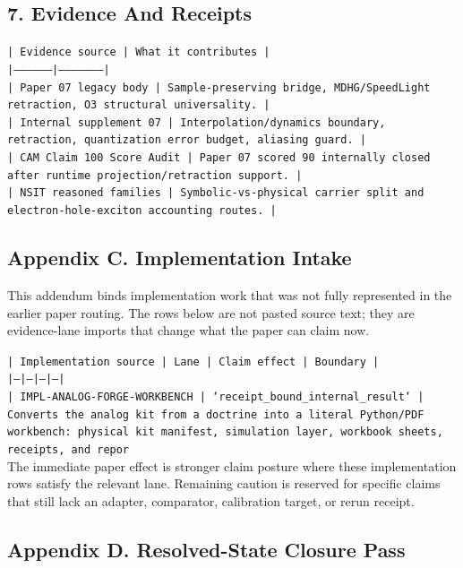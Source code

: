 \documentclass[11pt]{article}
\begin{document}
\subsection*{7. Evidence And Receipts}

\noindent\texttt{| Evidence source | What it contributes |}\\
\noindent\texttt{|-----------------|---------------------|}\\
\noindent\texttt{| Paper 07 legacy body | Sample-preserving bridge, MDHG/SpeedLight retraction, O3 structural universality. |}\\
\noindent\texttt{| Internal supplement 07 | Interpolation/dynamics boundary, retraction, quantization error budget, aliasing guard. |}\\
\noindent\texttt{| CAM Claim 100 Score Audit | Paper 07 scored 90 internally closed after runtime projection/retraction support. |}\\
\noindent\texttt{| NSIT reasoned families | Symbolic-vs-physical carrier split and electron-hole-exciton accounting routes. |}\\

\subsection*{Appendix C. Implementation Intake}

This addendum binds implementation work that was not fully represented in the earlier paper routing. The rows below are not pasted source text; they are evidence-lane imports that change what the paper can claim now.

\noindent\texttt{| Implementation source | Lane | Claim effect | Boundary |}\\
\noindent\texttt{|---|---|---|---|}\\
\noindent\texttt{| IMPL-ANALOG-FORGE-WORKBENCH | `receipt\_bound\_internal\_result` | Converts the analog kit from a doctrine into a literal Python/PDF workbench: physical kit manifest, simulation layer, workbook sheets, receipts, and repor}\\

The immediate paper effect is stronger claim posture where these implementation rows satisfy the relevant lane. Remaining caution is reserved for specific claims that still lack an adapter, comparator, calibration target, or rerun receipt.

\subsection*{Appendix D. Resolved-State Closure Pass}
\end{document}
